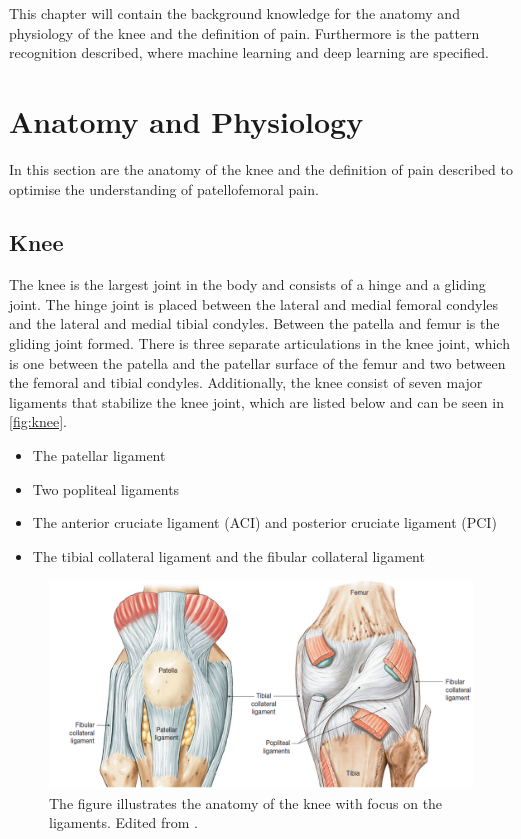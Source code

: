 This chapter will contain the background knowledge for the anatomy and physiology of the knee and the definition of pain. Furthermore is the pattern recognition described, where machine learning and deep learning are specified. 

\section{Anatomy and Physiology}
In this section are the anatomy of the knee and the definition of pain described to optimise the understanding of patellofemoral pain. 

\subsection{Knee}
The knee is the largest joint in the body and consists of a hinge and a gliding joint. The hinge joint is placed between the lateral and medial femoral condyles and the lateral and medial tibial condyles. Between the patella and femur is the gliding joint formed.\citep{Martini2012} 
There is three separate articulations in the knee joint, which is one between the patella and the patellar surface of the femur and two between the femoral and tibial condyles. Additionally, the knee consist of seven major ligaments that stabilize the knee joint, which are listed below and can be seen in \autoref{fig:knee}.\citep{Martini2012}

\begin{itemize}
\item The patellar ligament 
\item Two popliteal ligaments
\item The anterior cruciate ligament (ACI) and posterior cruciate ligament (PCI) 
\item The tibial collateral ligament and the fibular collateral ligament \citep{Martini2012}
\end{itemize}

\begin{figure} [H]
\centering
\includegraphics[width=1\textwidth]{figures/knee}
\caption{The figure illustrates the anatomy of the knee with focus on the ligaments. Edited from \citep{Martini2012}.}
\label{fig:knee}
\end{figure}


